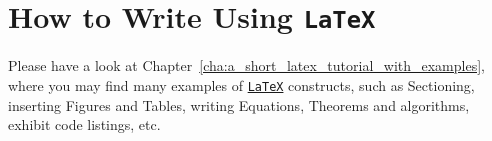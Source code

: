 \section{How to Write Using \texttt{LaTeX}} %
\label{sec:how_to_write_using_latex}

Please have a look at Chapter~\ref{cha:a_short_latex_tutorial_with_examples}, where you may find many examples of \href{http://tobi.oetiker.ch/lshort/lshort.pdf}{\texttt{LaTeX}} constructs, such as Sectioning, inserting Figures and Tables, writing Equations, Theorems and algorithms, exhibit code listings, etc.

